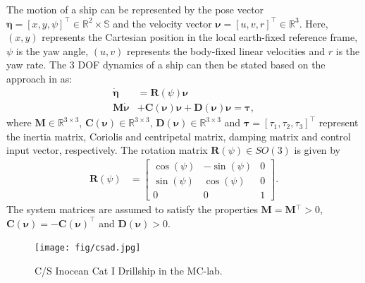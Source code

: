 The motion of a ship can be represented by the pose vector $\boldsymbol{\eta} = \left[ x ,y,\psi\right]^{\top} \in \mathbb{R}^2\times \mathbb{S}$ and the velocity vector $\boldsymbol{\nu} =\left[ u,v,r\right]^{\top}\in \mathbb{R}^3$.  Here, $(x,y)$ represents the Cartesian position in the local earth-fixed reference frame, $\psi$ is the yaw angle, $(u,v)$ represents the body-fixed linear velocities and $r$ is the yaw rate. The 3 DOF dynamics of a ship can then be stated based on the approach in \cite{fossen2011handbook} as:
\begin{align}
\boldsymbol{\dot{\eta}} &= \boldsymbol{R}(\psi)\boldsymbol{\nu}\label{eq:eta}\\
\boldsymbol{M\dot{\nu}}&+\boldsymbol{C(\nu)\nu}+\boldsymbol{D(\nu)\nu}=\boldsymbol{\tau},%
\label{eq:nu}
\end{align}
where $\boldsymbol{M} \in \mathbb{R}^{3\times 3}$, $\boldsymbol{C(\nu)} \in \mathbb{R}^{3\times 3}$, $\boldsymbol{D(\nu)} \in \mathbb{R}^{3\times 3}$ and $\boldsymbol{\tau}= [\tau_1,\tau_2,\tau_3]^{\top}$
represent the inertia matrix, Coriolis and centripetal matrix, damping matrix and control input vector, respectively. The rotation matrix $\boldsymbol{R}(\psi) \in SO(3)$ is given by
\begin{align}
\boldsymbol{R}(\psi) &= \begin{bmatrix}
\cos(\psi) & -\sin(\psi) & 0\\
\sin(\psi) & \cos(\psi) & 0\\
0 & 0 & 1
\end{bmatrix}.
\end{align}
The system matrices are assumed to satisfy the properties $\boldsymbol{M} = \boldsymbol{M}{}^{\top}>0$, $\boldsymbol{C}(\boldsymbol{\nu}) = -\boldsymbol{C}(\boldsymbol{\nu})^{\top}$ and $\boldsymbol{D}(\boldsymbol{\nu}) >0$. 

\begin{figure}[!h]
    \centering
    \texttt{[image: fig/csad.jpg]}
    \caption{C/S Inocean Cat I Drillship in the MC-lab.}
    \label{fig:CSAD}
\end{figure}


